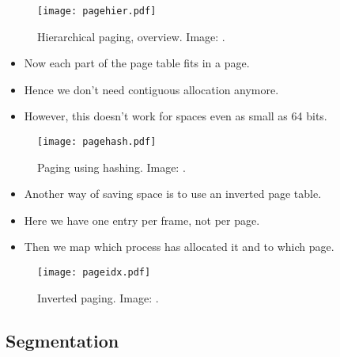 \documentclass{beamer}
\begin{document}
\begin{frame}{\insertsubsectionhead}
  \begin{figure}
    \texttt{[image: pagehier.pdf]}
    \caption{Hierarchical paging, overview.
      Image: \cite{Silberschatz2013osc}.}
  \end{figure}
\end{frame}

\begin{frame}{\insertsubsectionhead}
  \begin{itemize}
    \item Now each part of the page table fits in a page.
    \item Hence we don't need contiguous allocation anymore.
    \item However, this doesn't work for spaces even as small as 64 bits.
  \end{itemize}
\end{frame}

\begin{frame}{\insertsubsectionhead}
  \begin{figure}
    \texttt{[image: pagehash.pdf]}
    \caption{Paging using hashing.
      Image: \cite{Silberschatz2013osc}.}
  \end{figure}
\end{frame}

\begin{frame}{\insertsubsectionhead}
  \begin{itemize}
    \item Another way of saving space is to use an inverted page table.
    \item Here we have one entry per frame, not per page.
    \item Then we map which process has allocated it and to which page.
  \end{itemize}
\end{frame}

\begin{frame}{\insertsubsectionhead}
  \begin{figure}
    \texttt{[image: pageidx.pdf]}
    \caption{Inverted paging.
      Image: \cite{Silberschatz2013osc}.}
  \end{figure}
\end{frame}

\subsection{Segmentation}
\end{document}
